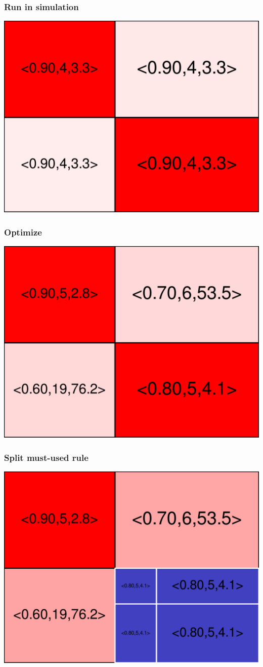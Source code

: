 \begin{frame}
\frametitle{Run in simulation}
\begin{centering}
\includegraphics[width=8.5 cm]{remy-graph/graph/test3.pdf}

\end{centering}
\end{frame}

\begin{frame}
\frametitle{Optimize}
\begin{centering}
\includegraphics[width=8.5 cm]{remy-graph/graph/test4.pdf}

\end{centering}
\end{frame}

\begin{frame}
\frametitle{Split must-used rule}
\begin{centering}
\includegraphics[width=8.5 cm]{remy-graph/graph/test5.pdf}

\end{centering}
\end{frame}

